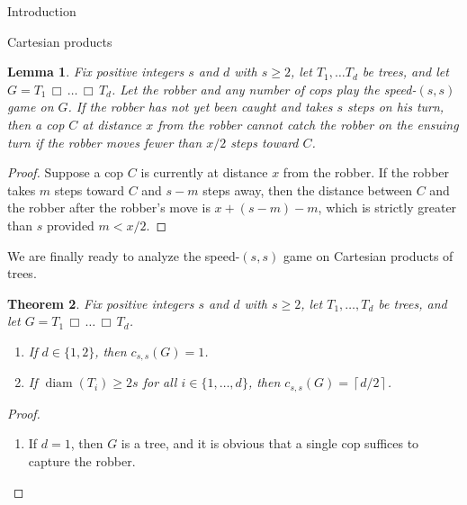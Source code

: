 \documentclass[12pt]{amsart}
\newcommand{\ceil}[1]{\ensuremath{\left\lceil #1\right\rceil} }
\newtheorem{lemma}{Lemma}[section]
\newtheorem{theorem}[lemma]{Theorem}
\theoremstyle{definition}
\DeclareMathOperator{\diam}{diam}
\def\cart{\, \Box \,}
\newcommand{\speeds}{c_{s,s}}
\begin{document}
\begin{section}{Introduction}
\begin{section}{Cartesian products}
\begin{lemma}\label{lem:distance_x/2}
    Fix positive integers $s$ and $d$ with $s\ge 2$, let $T_1,\dots T_d$ be trees, and let $G = T_1\cart\dots\cart T_d$.  Let the robber and any number of cops play the speed-$(s,s)$ game on $G$.  If the robber has not yet been caught and takes $s$ steps on his turn, then a cop $C$ at distance $x$ from the robber cannot catch the robber on the ensuing turn if the robber moves fewer than $x/2$ steps toward $C$.
\end{lemma}
\begin{proof}
    Suppose a cop $C$ is currently at distance $x$ from the robber.  
    If the robber takes $m$ steps toward $C$ and $s-m$ steps away, then the distance between $C$ and the robber after the robber's move is $x+(s-m)-m$, which is strictly greater than $s$ provided $m<x/2$.
\end{proof}

We are finally ready to analyze the speed-$(s,s)$ game on Cartesian products of trees.  

\begin{theorem}\label{thm:speed_s_large_grids}
Fix positive integers $s$ and $d$ with $s \ge 2$, let $T_1, \dots, T_d$ be trees, and let $G = T_1 \cart \dots \cart T_d$.  
\begin{enumerate}[label={(\alph*)}]
\item If $d \in \{1, 2\}$, then $\speeds(G) = 1$.
\item If $\diam(T_i) \ge 2s$ for all $i\in\{1,\dots,d\}$, then $\speeds(G) = \ceil{d/2}$.
\end{enumerate}
\end{theorem}
\begin{proof}
    \begin{enumerate}[label={\textbf{(\alph*)}}]
    
    \item \noindent If $d=1$, then $G$ is a tree, and it is obvious that a single cop suffices to capture the robber.\\ 


\end{enumerate}
\end{proof}
\end{section}
\end{section}
\end{document}
